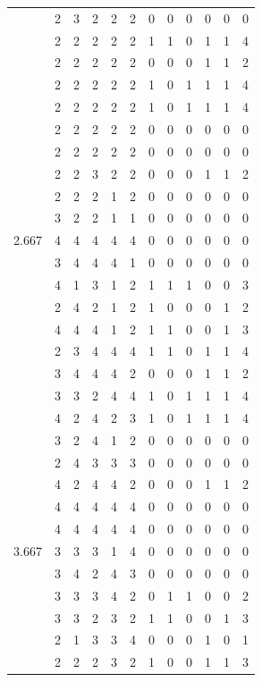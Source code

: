\documentclass[]{book}
\theoremstyle{definition}
\theoremstyle{definition}
\theoremstyle{definition}
\theoremstyle{remark}
\begin{document}
\begin{table}
{\begin{tabular}[t]{rrrrrrrrrrrr}
 & 2 & 3 & 2 & 2 & 2 & 0 & 0 & 0 & 0 & 0 & 0\\
 & 2 & 2 & 2 & 2 & 2 & 1 & 1 & 0 & 1 & 1 & 4\\
 & 2 & 2 & 2 & 2 & 2 & 0 & 0 & 0 & 1 & 1 & 2\\
 & 2 & 2 & 2 & 2 & 2 & 1 & 0 & 1 & 1 & 1 & 4\\
 & 2 & 2 & 2 & 2 & 2 & 1 & 0 & 1 & 1 & 1 & 4\\
 & 2 & 2 & 2 & 2 & 2 & 0 & 0 & 0 & 0 & 0 & 0\\
 & 2 & 2 & 2 & 2 & 2 & 0 & 0 & 0 & 0 & 0 & 0\\
 & 2 & 2 & 3 & 2 & 2 & 0 & 0 & 0 & 1 & 1 & 2\\
 & 2 & 2 & 2 & 1 & 2 & 0 & 0 & 0 & 0 & 0 & 0\\
 & 3 & 2 & 2 & 1 & 1 & 0 & 0 & 0 & 0 & 0 & 0\\
2.667 & 4 & 4 & 4 & 4 & 4 & 0 & 0 & 0 & 0 & 0 & 0\\
 & 3 & 4 & 4 & 4 & 1 & 0 & 0 & 0 & 0 & 0 & 0\\
 & 4 & 1 & 3 & 1 & 2 & 1 & 1 & 1 & 0 & 0 & 3\\
 & 2 & 4 & 2 & 1 & 2 & 1 & 0 & 0 & 0 & 1 & 2\\
 & 4 & 4 & 4 & 1 & 2 & 1 & 1 & 0 & 0 & 1 & 3\\
 & 2 & 3 & 4 & 4 & 4 & 1 & 1 & 0 & 1 & 1 & 4\\
 & 3 & 4 & 4 & 4 & 2 & 0 & 0 & 0 & 1 & 1 & 2\\
 & 3 & 3 & 2 & 4 & 4 & 1 & 0 & 1 & 1 & 1 & 4\\
 & 4 & 2 & 4 & 2 & 3 & 1 & 0 & 1 & 1 & 1 & 4\\
 & 3 & 2 & 4 & 1 & 2 & 0 & 0 & 0 & 0 & 0 & 0\\
 & 2 & 4 & 3 & 3 & 3 & 0 & 0 & 0 & 0 & 0 & 0\\
 & 4 & 2 & 4 & 4 & 2 & 0 & 0 & 0 & 1 & 1 & 2\\
 & 4 & 4 & 4 & 4 & 4 & 0 & 0 & 0 & 0 & 0 & 0\\
 & 4 & 4 & 4 & 4 & 4 & 0 & 0 & 0 & 0 & 0 & 0\\
3.667 & 3 & 3 & 3 & 1 & 4 & 0 & 0 & 0 & 0 & 0 & 0\\
 & 3 & 4 & 2 & 4 & 3 & 0 & 0 & 0 & 0 & 0 & 0\\
 & 3 & 3 & 3 & 4 & 2 & 0 & 1 & 1 & 0 & 0 & 2\\
 & 3 & 3 & 2 & 3 & 2 & 1 & 1 & 0 & 0 & 1 & 3\\
 & 2 & 1 & 3 & 3 & 4 & 0 & 0 & 0 & 1 & 0 & 1\\
 & 2 & 2 & 2 & 3 & 2 & 1 & 0 & 0 & 1 & 1 & 3\\

\end{tabular}}
\end{table}
\end{document}
